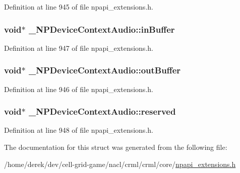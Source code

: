 Definition at line 945 of file npapi\_\-extensions.h.

\hypertarget{struct___n_p_device_context_audio_a8366d3cc305d9c97076ae202fa7eb4f3}{
\subsubsection[{inBuffer}]{\setlength{\rightskip}{0pt plus 5cm}void$\ast$ {\bf \_\-NPDeviceContextAudio::inBuffer}}}
\label{struct___n_p_device_context_audio_a8366d3cc305d9c97076ae202fa7eb4f3}


Definition at line 947 of file npapi\_\-extensions.h.

\hypertarget{struct___n_p_device_context_audio_a059607d2ba7cc02d5cdc10fc7e4b2b89}{
\subsubsection[{outBuffer}]{\setlength{\rightskip}{0pt plus 5cm}void$\ast$ {\bf \_\-NPDeviceContextAudio::outBuffer}}}
\label{struct___n_p_device_context_audio_a059607d2ba7cc02d5cdc10fc7e4b2b89}


Definition at line 946 of file npapi\_\-extensions.h.

\hypertarget{struct___n_p_device_context_audio_a125bbc1c103ad897b7f2479d6ac34b6b}{
\subsubsection[{reserved}]{\setlength{\rightskip}{0pt plus 5cm}void$\ast$ {\bf \_\-NPDeviceContextAudio::reserved}}}
\label{struct___n_p_device_context_audio_a125bbc1c103ad897b7f2479d6ac34b6b}


Definition at line 948 of file npapi\_\-extensions.h.



The documentation for this struct was generated from the following file:\begin{DoxyCompactItemize}
\item 
/home/derek/dev/cell-\/grid-\/game/nacl/crml/crml/core/\hyperlink{npapi__extensions_8h}{npapi\_\-extensions.h}\end{DoxyCompactItemize}
